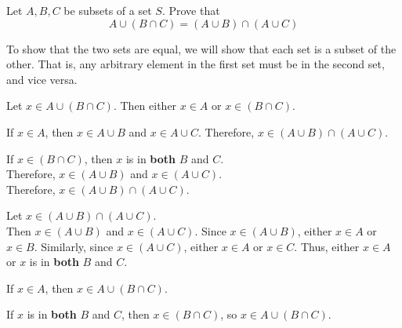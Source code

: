 \begin{problem}
  Let $A, B, C$ be subsets of a set $S$.
  Prove that \[ A \cup (B \cap C) = (A \cup B) \cap (A \cup C)\]
\end{problem}
\begin{answer}
  To show that the two sets are equal, we will show that each set is a subset
  of the other. That is, any arbitrary element in the first set must be in
  the second set, and vice versa.

  \begin{enumroman}
    \item Let $x \in A \cup (B \cap C)$. Then either $x \in A$ or $x \in (B \cap C)$.
    \begin{enumarabic}
        \item If $x \in A$, then $x \in A \cup B$ and $x \in A \cup C$.
          Therefore, $x \in (A \cup B) \cap (A \cup C)$.
        \item If $x \in (B \cap C)$, then  $x$ is in \textbf{both} $B$ and $C$. \\
          Therefore, $x \in (A \cup B)$ and $x \in (A \cup C)$. \\ Therefore, $x \in (A \cup B)
          \cap (A \cup C)$.
      \end{enumarabic}
    
      \item Let $x \in (A \cup B) \cap (A \cup C)$. \\ Then $x \in (A \cup B)$ and
        $x \in (A \cup C)$.
        Since $x \in (A \cup B)$, either $x \in A$ or $x \in B$.
        Similarly, since $x \in (A \cup C)$, either $x \in A$ or $x \in C$.
        Thus, either $x \in A$ or $x$ is in \textbf{both} $B$ and $C$.
        \begin{enumarabic}
          \item If $x \in A$, then $x \in A \cup (B \cap C)$.
          \item If $x$ is in \textbf{both} $B$ and $C$, then $x \in (B \cap C)$,
            so $x \in A \cup (B \cap C)$.
        \end{enumarabic}
  \end{enumroman}
\end{answer}

